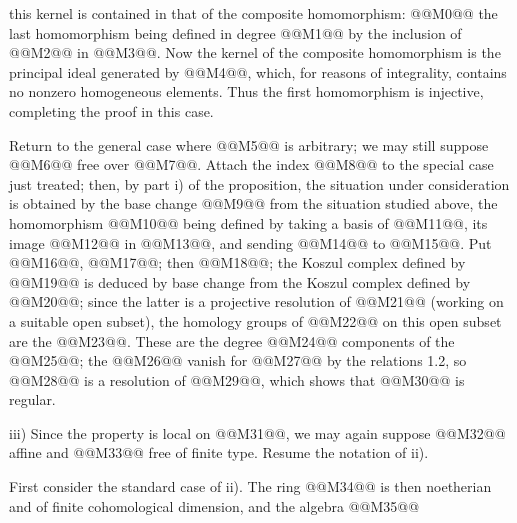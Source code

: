 this kernel is contained in that of the composite homomorphism:
@@M0@@
the last homomorphism being defined in degree @@M1@@ by the inclusion of @@M2@@ in @@M3@@. Now the kernel of the composite homomorphism is the principal ideal generated by @@M4@@, which, for reasons of integrality, contains no nonzero homogeneous elements. Thus the first homomorphism is injective, completing the proof in this case.

Return to the general case where @@M5@@ is arbitrary; we may still suppose @@M6@@ free over @@M7@@. Attach the index @@M8@@ to the special case just treated; then, by part i) of the proposition, the situation under consideration is obtained by the base change @@M9@@ from the situation studied above, the homomorphism @@M10@@ being defined by taking a basis of @@M11@@, its image @@M12@@ in @@M13@@, and sending @@M14@@ to @@M15@@. Put @@M16@@, @@M17@@; then @@M18@@; the Koszul complex defined by @@M19@@ is deduced by base change from the Koszul complex defined by @@M20@@; since the latter is a projective resolution of @@M21@@ (working on a suitable open subset), the homology groups of @@M22@@ on this open subset are the @@M23@@. These are the degree @@M24@@ components of the @@M25@@; the @@M26@@ vanish for @@M27@@ by the relations 1.2, so @@M28@@ is a resolution of @@M29@@, which shows that @@M30@@ is regular.

iii) Since the property is local on @@M31@@, we may again suppose @@M32@@ affine and @@M33@@ free of finite type. Resume the notation of ii).

First consider the standard case of ii). The ring @@M34@@ is then noetherian and of finite cohomological dimension, and the algebra @@M35@@
